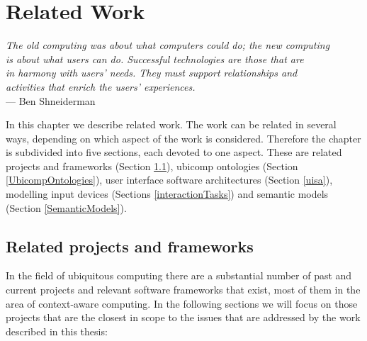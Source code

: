 \chapter{Related Work}

\begin{flushright}{\slshape
The old computing was about what computers could do; the new computing \\
is about what users can do. Successful technologies are those that are\\
in harmony with users' needs. They must support relationships and \\
activities that enrich the users' experiences. } \\ \medskip
	    --- Ben Shneiderman
	\end{flushright}

In this chapter we describe related work. The work can be related in several ways, depending on which aspect of the work is considered. Therefore the chapter is subdivided into five sections, each devoted to one aspect. These are related projects and frameworks (Section \ref{RelatedProjects}), ubicomp ontologies (Section \ref{UbicompOntologies}), user interface software architectures (Section \ref{uisa}), modelling input devices (Sections \ref{interactionTasks}) and semantic models (Section \ref{SemanticModels}).


\section{Related projects and frameworks}
\label{RelatedProjects}
% 
% 

In the field of ubiquitous computing there are a substantial number of past and current projects and relevant software frameworks that exist, most of them in the area of context-aware computing. In the following sections we will focus on those projects that are the closest in scope to the issues that are addressed by the work described in this thesis:

